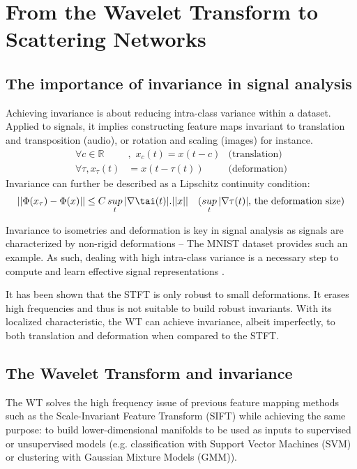 \documentclass[runningheads]{llncs}
\begin{document}
\section{From the Wavelet Transform to Scattering Networks}

\subsection{The importance of invariance in signal analysis}

Achieving invariance is about reducing intra-class variance within a dataset. Applied to signals, it implies constructing feature maps invariant to translation and transposition (audio), or rotation and scaling (images) for instance.
\begin{align}
    \forall c\in\mathbb{R}&,\,\,x_c(t) = x(t-c)&\text{(translation)}\\
    \forall \tau, x_\tau(t) &= x(t-\tau(t))&\text{(deformation)}
\end{align}
Invariance can further be described as a Lipschitz continuity condition\cite{bruna2012invariant}\cite{mallatlecture}:
\begin{align}
    ||\Phi(x_\tau)-\Phi(x)||&\le C\,\underset{t}{sup}\,|\nabla\tai(t)|.||x||&\text{($\underset{t}{sup}\,|\nabla\tau(t)|$, the deformation size)}
\end{align}

Invariance to isometries and deformation is key in signal analysis as signals are characterized by non-rigid deformations -- The MNIST dataset provides such an example\cite{lecun2}. As such, dealing with high intra-class variance is a necessary step to compute and learn effective signal representations \cite{bajcsy}\cite{keysers}\cite{trouve}.

It has been shown that the STFT is only robust to small deformations\cite{bruna2012invariant}. It erases high frequencies and thus is not suitable to build robust invariants. With its localized characteristic, the WT can achieve invariance, albeit imperfectly, to both translation and deformation when compared to the STFT\cite{bruna2012invariant}\cite{mallatlecture}.

\subsection{The Wavelet Transform and invariance}

The WT solves the high frequency issue of previous feature mapping methods such as the Scale-Invariant Feature Transform (SIFT)\cite{bruna2012invariant} while achieving the same purpose: to build lower-dimensional manifolds to be used as inputs to supervised or unsupervised models (e.g. classification with Support Vector Machines (SVM) or clustering with Gaussian Mixture Models (GMM)\cite{sanchez1}\cite{sanchez2}).
\end{document}
